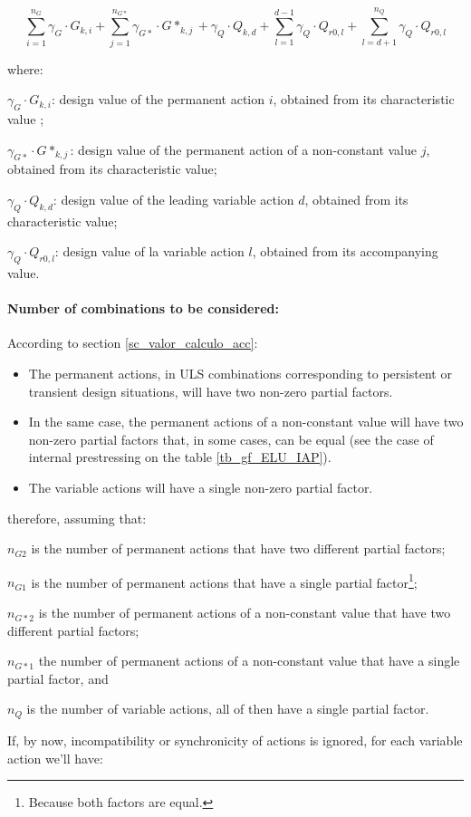 \begin{equation} \label{eq_comb_spt}
\sum_{i=1}^{n_G} \gamma_G \cdot G_{k,i} +\sum_{j=1}^{n_{G*}} \gamma_{G*} \cdot G*_{k,j} + \gamma_Q \cdot Q_{k,d} + \sum_{l=1}^{d-1} \gamma_Q \cdot Q_{r0,l} + \sum_{l=d+1}^{n_Q} \gamma_Q \cdot Q_{r0,l} 
\end{equation}

\noindent where:

\begin{description}
\item{$\gamma_G \cdot G_{k,i}$:} design value of the permanent action $i$, obtained from its characteristic value  ;
\item{$\gamma_{G*} \cdot G*_{k,j}$:} design value of the permanent action of a non-constant value $j$, obtained from its characteristic value;
\item{$\gamma_Q \cdot Q_{k,d}$:} design value of the leading variable action $d$, obtained from its characteristic value;
\item{$\gamma_Q \cdot Q_{r0,l}$:} design value of la variable action $l$, obtained from its accompanying value.
\end{description}

\paragraph{Number of combinations to be considered:} According to section \ref{sc_valor_calculo_acc}:

\begin{itemize}
\item The permanent actions, in ULS combinations corresponding to persistent or transient design situations, will have two non-zero partial factors.
\item In the same case, the permanent actions of a non-constant value will have two non-zero partial factors that, in some cases, can be equal (see the case of internal prestressing on the table \ref{tb_gf_ELU_IAP}).
\item The variable actions will have a single non-zero partial factor.
\end{itemize}

\noindent therefore, assuming that:

\begin{description}
\item{$n_{G2}$} is the number of permanent actions that have two different partial factors;
\item{$n_{G1}$} is the number of permanent actions that have a single partial factor\footnote{Because both factors are equal.};
\item{$n_{G*2}$} is the number of permanent actions of a non-constant value that have two different partial factors;
\item{$n_{G*1}$} the number of permanent actions of a non-constant value that have a single partial factor, and
\item $n_{Q}$ is the number of variable actions, all of then have a single partial factor.
\end{description}
If, by now, incompatibility or synchronicity of actions is ignored, for each variable action we'll have:

